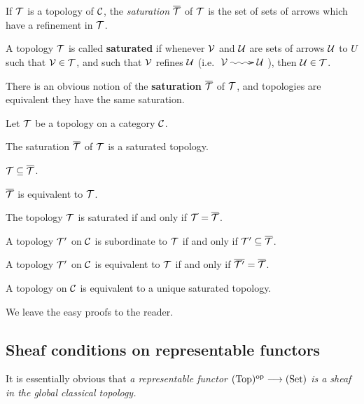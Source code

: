 \begin{2   CONTRAVARIANT FUNCTORS}
\begin{2.3 Sheaves in Grothendieck topologies}
\begin{definition}
If $\mathcal{T}$ is a topology of $\mathcal{C}$, the \emph{saturation}%
%
 $\overline{\mathcal{T}}$ of $\mathcal{T}$ is the set of sets of arrows which have a refinement in $\mathcal{T}$.
\end{definition}
\begin{shaded}
A topology $\mathcal{T}$ is called \textbf{saturated} if whenever $\mathcal{V}$ and $\mathcal{U}$ are sets of arrows $\mathcal{U}$ to $U$ such that $\mathcal{V}\in\mathcal{T}$, and such that $\mathcal{V}$ refines $\mathcal{U}$ (i.e.\!
$\xymatrix{\calV\ar@{~>}[r]&\calU}$\!), then $\mathcal{U}\in\mathcal{T}$.

There is an obvious notion of the \textbf{saturation} $\overline{\mathcal{T}}$ of $\mathcal{T}$, and topologies are equivalent \Iff they have the same saturation.
\end{shaded}


\begin{proposition}
Let $\mathcal{T}$ be a topology on a category $\mathcal{C}$.

\begin{enumeratei}

\item The saturation $\overline{\mathcal{T}}$ of $\mathcal{T}$ is a saturated topology.

\item $\mathcal{T} \subseteq \overline{\mathcal{T}}$.

\item $\overline{\mathcal{T}}$ is equivalent to $\mathcal{T}$.

\item The topology $\mathcal{T}$ is saturated if and only if $\mathcal{T} = \overline{\mathcal{T}}$.

\item A topology $\mathcal{T}'$ on $\mathcal{C}$ is subordinate to $\mathcal{T}$ if and only if $\mathcal{T}' \subseteq \overline{\mathcal{T}}$.

\item A topology $\mathcal{T}'$ on $\mathcal{C}$ is equivalent to $\mathcal{T}$ if and only if $\overline{\mathcal{T}'} =
\overline{\mathcal{T}}$.

\item A topology on $\mathcal{C}$ is equivalent to a unique saturated topology.

\end{enumeratei}
\end{proposition}

We leave the easy proofs to the reader.




\subsection{Sheaf conditions on representable functors}
\hfil
\begin{shaded}
It is essentially obvious that \textit{a representable functor $\cattop\op \arr \catset$ is a sheaf in the global classical topology.}


\end{shaded}
\end{2.3 Sheaves in Grothendieck topologies}
\end{2   CONTRAVARIANT FUNCTORS}

